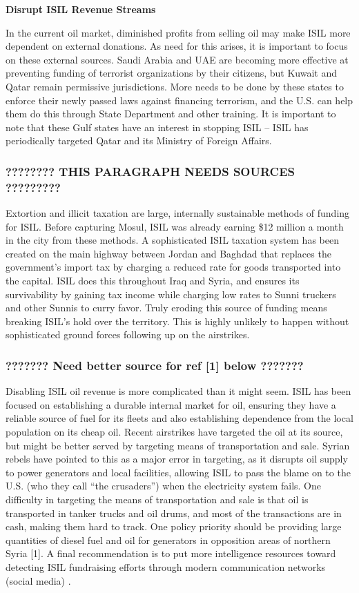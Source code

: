 \documentclass{report}
\begin{document}
\textbf{Disrupt ISIL Revenue Streams}

In the current oil market, diminished profits from selling oil may make ISIL more dependent on external donations. As need for this arises, it is important to focus on these external sources. Saudi Arabia and UAE are becoming more effective at preventing funding of terrorist organizations by their citizens, but Kuwait and Qatar remain permissive jurisdictions. More needs to be done by these states to enforce their newly passed laws against financing terrorism, and the U.S. can help them do this through State Department and other training. It is important to note that these Gulf states have an interest in stopping ISIL – ISIL has periodically targeted Qatar and its Ministry of Foreign Affairs. \subsubsection{???????? THIS PARAGRAPH NEEDS SOURCES   ?????????} 

Extortion and illicit taxation are large, internally sustainable methods of funding for ISIL. Before capturing Mosul, ISIL was already earning \$12 million a month in the city from these methods. A sophisticated ISIL taxation system has been created on the main highway between Jordan and Baghdad that replaces the government's import tax by charging a reduced rate for goods transported into the capital. ISIL does this throughout Iraq and Syria, and ensures its survivability by gaining tax income while charging low rates to Sunni truckers and other Sunnis to curry favor. Truly eroding this source of funding means breaking ISIL's hold over the territory. This is highly unlikely to happen without sophisticated ground forces following up on the airstrikes. 

\subsubsection{???????  Need better source for ref [1]  below  ???????}


Disabling ISIL oil revenue is more complicated than it might seem. ISIL has been focused on establishing a durable internal market for oil, ensuring they have a reliable source of fuel for its fleets and also establishing dependence from the local population on its cheap oil. Recent airstrikes have targeted the oil at its source, but might be better served by targeting means of transportation and sale. Syrian rebels have pointed to this as a major error in targeting, as it disrupts oil supply to power generators and local facilities, allowing ISIL to pass the blame on to the U.S. (who they call \enquote{the crusaders}) when the electricity system fails. One difficulty in targeting the means of transportation and sale is that oil is transported in tanker trucks and oil drums, and most of the transactions are in cash, making them hard to track. One policy priority should be providing large quantities of diesel fuel and oil for generators in opposition areas of northern Syria [1].
A final recommendation is to put more intelligence resources toward detecting ISIL fundraising efforts through modern communication networks (social media) \cite{Report2015}.
\end{document}

